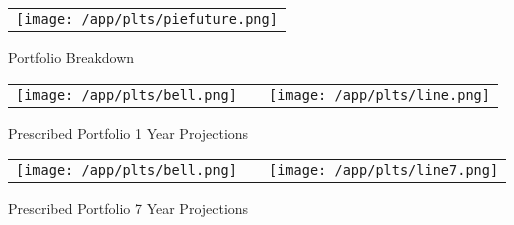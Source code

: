 \documentclass{article}
\begin{document}
\begin{adjustwidth}{-.3in}{0in}%
\vspace*{-1cm}

\begin{center}
  \begin{tabular}{c}
    \texttt{[image: /app/plts/piefuture.png]}
  \end{tabular}
  \end{center}

  \begin{center}
        Portfolio Breakdown
  \end{center}

\vspace{.7cm}


\begin{center}
  \begin{tabular}{lcr}
  \texttt{[image: /app/plts/bell.png]}
    & \hspace{1cm }&\texttt{[image: /app/plts/line.png]}
  \end{tabular}
  \end{center}

  \begin{center}
      Prescribed Portfolio 1 Year Projections
  \end{center}

  \vspace{.7cm}


\begin{center}
  \begin{tabular}{lcr}
  \texttt{[image: /app/plts/bell.png]}
    & \hspace{1cm }&\texttt{[image: /app/plts/line7.png]}
  \end{tabular}
  \end{center}

  \begin{center}
      Prescribed Portfolio 7 Year Projections
  \end{center}

\vspace{.6cm}

\end{adjustwidth}
\end{document}
